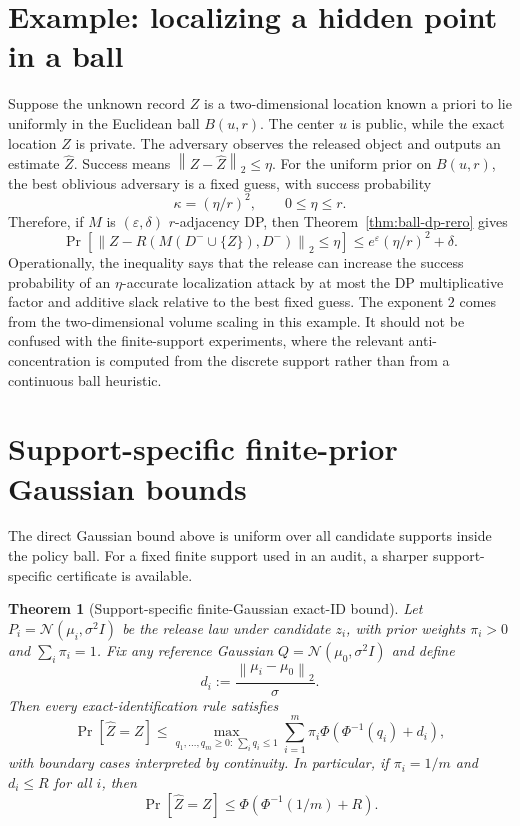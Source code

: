 \documentclass[11pt,a4paper]{report}
\theoremstyle{plain}
\newtheorem{theorem}{Theorem}[chapter]
\theoremstyle{definition}
\theoremstyle{remark}
\newcommand{\N}{\mathcal{N}}
\newcommand{\norm}[1]{\left\lVert #1\right\rVert}
\begin{document}
\section{Example: localizing a hidden point in a ball}
\label{sec:localizing-example}

Suppose the unknown record $Z$ is a two-dimensional location known a priori to lie uniformly in the Euclidean ball $B(u,r)$.  The center $u$ is public, while the exact location $Z$ is private.  The adversary observes the released object and outputs an estimate $\widehat Z$.  Success means $\norm{Z-\widehat Z}_2\le\eta$.  For the uniform prior on $B(u,r)$, the best oblivious adversary is a fixed guess, with success probability
\[
\kappa=(\eta/r)^2,
\qquad
0\le \eta\le r.
\]
Therefore, if $M$ is $(\varepsilon,\delta)$ $r$-adjacency DP, then Theorem~\ref{thm:ball-dp-rero} gives
\[
\Pr[\norm{Z-R(M(D^-\cup\{Z\}),D^-)}_2\le\eta]
\le
 e^\varepsilon(\eta/r)^2+\delta.
\]
Operationally, the inequality says that the release can increase the success probability of an $\eta$-accurate localization attack by at most the DP multiplicative factor and additive slack relative to the best fixed guess.  The exponent $2$ comes from the two-dimensional volume scaling in this example.  It should not be confused with the finite-support experiments, where the relevant anti-concentration is computed from the discrete support rather than from a continuous ball heuristic.

\section{Support-specific finite-prior Gaussian bounds}
\label{sec:support-specific-bounds}

The direct Gaussian bound above is uniform over all candidate supports inside the policy ball.  For a fixed finite support used in an audit, a sharper support-specific certificate is available.

\begin{theorem}[Support-specific finite-Gaussian exact-ID bound]
\label{thm:finite-gaussian-support-bound}
Let $P_i=\N(\mu_i,\sigma^2I)$ be the release law under candidate $z_i$, with prior weights $\pi_i>0$ and $\sum_i\pi_i=1$.  Fix any reference Gaussian $Q=\N(\mu_0,\sigma^2I)$ and define
\[
d_i:=\frac{\norm{\mu_i-\mu_0}_2}{\sigma}.
\]
Then every exact-identification rule satisfies
\[
\Pr[\widehat Z=Z]
\le
\max_{q_1,\ldots,q_m\ge0:\,\sum_iq_i\le1}
\sum_{i=1}^m\pi_i\Phi\left(\Phi^{-1}(q_i)+d_i\right),
\]
with boundary cases interpreted by continuity.  In particular, if $\pi_i=1/m$ and $d_i\le R$ for all $i$, then
\[
\Pr[\widehat Z=Z]
\le
\Phi\left(\Phi^{-1}(1/m)+R\right).
\]
\end{theorem}
\end{document}
